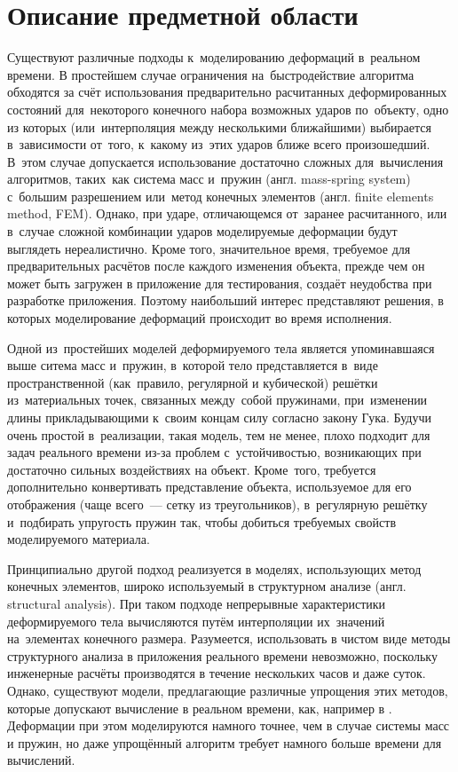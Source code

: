 \documentclass[a4paper,11pt]{report}
\begin{document}
  \chapter{Описание предметной области}\label{domain}

    Существуют различные подходы к~моделированию деформаций в~реальном времени. В простейшем случае
    ограничения на~быстродействие алгоритма обходятся за счёт использования предварительно расчитанных
    деформированных состояний для~некоторого конечного набора возможных ударов по~объекту, одно из которых
    (или~интерполяция между несколькими ближайшими) выбирается в~зависимости от~того, к~какому
    из~этих ударов ближе всего произошедший. В~этом случае допускается использование достаточно сложных
    для~вычисления алгоритмов, таких~как система масс и~пружин (англ. {\English mass-spring system})
    с~большим разрешением или~метод конечных элементов (англ. {\English finite elements method, FEM}).
    Однако, при ударе, отличающемся от~заранее расчитанного, или в~случае сложной комбинации ударов
    моделируемые деформации будут выглядеть нереалистично. Кроме того, значительное время, требуемое
    для предварительных расчётов после каждого изменения объекта, прежде чем он может быть загружен
    в приложение для тестирования, создаёт неудобства при разработке приложения. Поэтому наибольший
    интерес представляют решения, в которых моделирование деформаций происходит во время исполнения.

    Одной из~простейших моделей деформируемого тела является упоминавшаяся выше ситема масс
    и~пружин, в~которой тело представляется в~виде пространственной (как~правило, регулярной и
    кубической) решётки из~материальных точек, связанных между~собой пружинами, при~изменении длины
    прикладывающими к~своим концам силу согласно закону Гука. Будучи очень простой в~реализации,
    такая модель, тем не менее, плохо подходит для задач реального времени из-за проблем с~устойчивостью,
    возникающих при достаточно сильных воздействиях на объект. Кроме~того, требуется дополнительно
    конвертивать представление объекта, используемое для его отображения (чаще всего~--- сетку из
    треугольников), в~регулярную решётку и~подбирать упругость пружин так, чтобы добиться требуемых
    свойств моделируемого материала.

    Принципиально другой подход реализуется в моделях, использующих метод конечных элементов, широко
    используемый в структурном анализе (англ. {\English structural analysis}). При таком подходе
    непрерывные характеристики деформируемого тела вычисляются путём интерполяции их~значений
    на~элементах конечного размера. Разумеется, использовать в чистом виде методы структурного
    анализа в приложения реального времени невозможно, поскольку инженерные расчёты производятся в
    течение нескольких часов и даже суток. Однако, существуют модели, предлагающие различные упрощения этих
    методов, которые допускают вычисление в реальном времени, как, например в \cite{muller-stable}.
    Деформации при этом моделируются намного точнее, чем в случае системы масс и пружин, но даже
    упрощённый алгоритм требует намного больше времени для вычислений.
\end{document}
